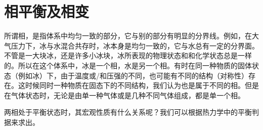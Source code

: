 ﻿\section{相平衡及相变}
所谓相，是指体系中均匀一致的部分，它与别的部分有明显的分界线。例如，在大气压力下，冰与水混合共存时，冰本身是均匀一致的，它与水总有一定的分界面。不管是一大块冰，还是许多小冰块，冰所表现的物理状态和和化学状态总是一样的。所以在这个体系中，冰是一个相，水是另一个相。有时在同一种物质的固体状态（例如冰）下，由于温度或/和压强的不同，也可能有不同的结构（对称性）存在。这时候同时一种物质在固态下的不同结构，我们认为也是属于不同的相。但是在气体状态时，无论是由单一种气体或是几种不同气体组成，都是单一个相。

两相处于平衡状态时，其宏观性质有什么关系呢？我们可以根据热力学中的平衡判据来求出。
